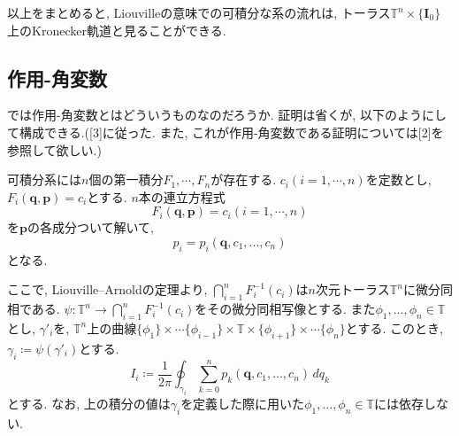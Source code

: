 \documentclass{ltjsarticle}
\theoremstyle{definition}
\numberwithin{thm}{section}
\theoremstyle{definition}
\numberwithin{prop}{section}
\theoremstyle{definition}
\numberwithin{dfn}{section}
\numberwithin{equation}{section}
\begin{document}
以上をまとめると, Liouvilleの意味での可積分な系の流れは, トーラス$\mathbb{T}^n\times\{\bm{I}_0\}$上のKronecker軌道と見ることができる.
\subsection{作用-角変数}
では作用-角変数とはどういうものなのだろうか. 証明は省くが, 以下のようにして構成できる.([3]に従った. また, これが作用-角変数である証明については[2]を参照して欲しい.)

可積分系には$n$個の第一積分$F_1,\cdots,F_n$が存在する. $c_i(i=1,\cdots,n)$を定数とし,$F_i(\bm{q},\bm{p})=c_i$とする. $n$本の連立方程式
\begin{equation*}
    F_i(\bm{q},\bm{p})=c_i(i=1,\cdots,n)
\end{equation*}
を$\bm{p}$の各成分ついて解いて,
\begin{equation}
    p_i=p_i(\bm{q},c_1,...,c_n)
\end{equation}
となる.

ここで, Liouville--Arnoldの定理より, $\bigcap_{i=1}^n F_i^{-1}(c_i)$は$n$次元トーラス$\mathbb{T}^n$に微分同相である. $\psi:\mathbb{T}^n\to\bigcap_{i=1}^n F_i^{-1}(c_i)$をその微分同相写像とする. また$\phi_1,...,\phi_n\in\mathbb{T}$とし, $\gamma'_i$を, $\mathbb{T}^n$上の曲線$\{\phi_1\}\times\cdots\{\phi_{i-1}\}\times\mathbb{T}\times\{\phi_{i+1}\}\times\cdots\{\phi_n\}$とする. このとき,$\gamma_i\coloneq \psi(\gamma'_i)$とする.
\begin{equation}
    I_i\coloneq \frac{1}{2\pi}\oint_{\gamma_i}\sum_{k=0}^{n}{p_k(\bm{q},c_1,...,c_n)\, dq_k}
\end{equation}
とする. なお, 上の積分の値は$\gamma_i$を定義した際に用いた$\phi_1,...,\phi_n\in\mathbb{T}$には依存しない.
\end{document}
